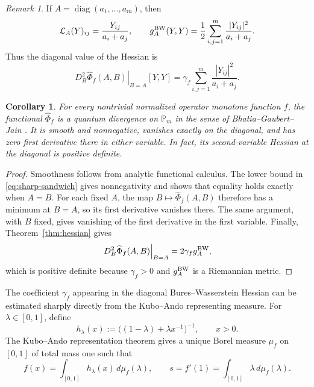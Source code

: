 \documentclass[11pt]{amsart}
\newtheorem{corollary}[theorem]{Corollary}
\theoremstyle{definition}
\theoremstyle{remark}
\newtheorem{remark}[theorem]{Remark}
\newcommand{\Pm}{\mathbb P_m}
\newcommand{\altPhi}{\widehat{\Phi}}
\begin{document}
	\begin{remark}
		If $A=\operatorname{diag}(a_1,\ldots,a_m)$, then
		\[
		\mathcal L_A(Y)_{ij}=\frac{Y_{ij}}{a_i+a_j},
		\qquad
		g_A^{\rm BW}(Y,Y)
		=\frac12\sum_{i,j=1}^m\frac{|Y_{ij}|^2}{a_i+a_j}.
		\]
		Thus the diagonal value of the Hessian is
		\[
		\left.D_B^2\altPhi_f(A,B)\right|_{B=A}[Y,Y]
		=\gamma_f\sum_{i,j=1}^m\frac{|Y_{ij}|^2}{a_i+a_j}.
		\]
	\end{remark}
	
\begin{corollary}\label{cor:quantum-divergence}
	For every nontrivial normalized operator monotone function $f$, the
	functional $\altPhi_f$ is a quantum divergence on $\Pm$ in the sense
	of Bhatia--Gaubert--Jain \cite{BGJ2019}. It is smooth and nonnegative,
	vanishes exactly on the diagonal, and has zero first derivative there in
	either variable. In fact, its second-variable Hessian at the diagonal is
	positive definite.
\end{corollary}

\begin{proof}
	Smoothness follows from analytic functional calculus.  The lower bound in
	\eqref{eq:sharp-sandwich} gives nonnegativity and shows that equality holds
	exactly when $A=B$.  For each fixed $A$, the map
	$B\mapsto\altPhi_f(A,B)$ therefore has a minimum at $B=A$, so its first
	derivative vanishes there.  The same argument, with $B$ fixed, gives
	vanishing of the first derivative in the first variable.  Finally,
	Theorem~\ref{thm:hessian} gives
	\[
	\left.D_B^2\altPhi_f(A,B)\right|_{B=A}
	=2\gamma_f g_A^{\rm BW},
	\]
	which is positive definite because $\gamma_f>0$ and
	$g_A^{\rm BW}$ is a Riemannian metric.
\end{proof}
	

	The coefficient $\gamma_f$ appearing in the diagonal
	Bures--Wasserstein Hessian can be estimated sharply directly from the
	Kubo--Ando representing measure.  For $\lambda\in[0,1]$, define
	\[
	h_\lambda(x)
	:=\bigl((1-\lambda)+\lambda x^{-1}\bigr)^{-1},
	\qquad x>0.
	\]
	The Kubo--Ando representation theorem gives a unique Borel measure
	$\mu_f$ on $[0,1]$ of total mass one such that
	\begin{equation}\label{eq:representing-measure}
		f(x)=\int_{[0,1]}h_\lambda(x)\,d\mu_f(\lambda),
		\qquad
		s=f'(1)=\int_{[0,1]}\lambda\,d\mu_f(\lambda).
	\end{equation}
	
\end{document}
